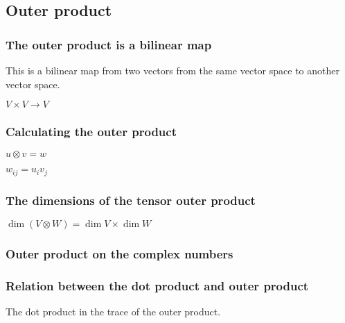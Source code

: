 
\subsection{Outer product}

\subsubsection{The outer product is a bilinear map}

This is a bilinear map from two vectors from the same vector space to another vector space.

\(V\times V \rightarrow V\)

\subsubsection{Calculating the outer product}

\(u\otimes v = w\)

\(w_{ij}=u_iv_j\)

\subsubsection{The dimensions of the tensor outer product}

\(\dim (V \otimes W)= \dim V \times \dim W \)

\subsubsection{Outer product on the complex numbers}

\subsubsection{Relation between the dot product and outer product}

The dot product in the trace of the outer product.


